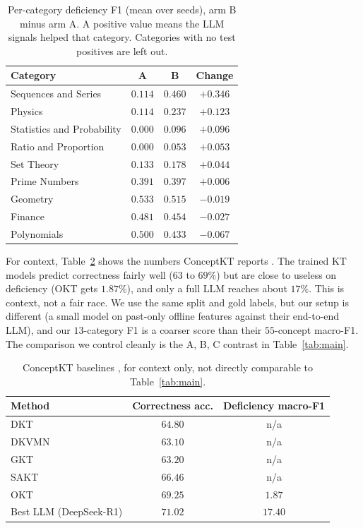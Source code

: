 \documentclass[11pt]{article}
\begin{document}
\begin{table}[t]
\centering
\caption{Per-category deficiency F1 (mean over seeds), arm B minus arm A. A positive
value means the LLM signals helped that category. Categories with no test positives are
left out.}
\label{tab:erroranalysis}
\small
\begin{tabular}{@{}lccc@{}}
\toprule
\textbf{Category} & \textbf{A} & \textbf{B} & \textbf{Change}\\
\midrule
Sequences and Series        & $0.114$ & $0.460$ & $+0.346$\\
Physics                     & $0.114$ & $0.237$ & $+0.123$\\
Statistics and Probability  & $0.000$ & $0.096$ & $+0.096$\\
Ratio and Proportion        & $0.000$ & $0.053$ & $+0.053$\\
Set Theory                  & $0.133$ & $0.178$ & $+0.044$\\
Prime Numbers               & $0.391$ & $0.397$ & $+0.006$\\
Geometry                    & $0.533$ & $0.515$ & $-0.019$\\
Finance                     & $0.481$ & $0.454$ & $-0.027$\\
Polynomials                 & $0.500$ & $0.433$ & $-0.067$\\
\bottomrule
\end{tabular}
\end{table}

For context, Table~\ref{tab:context} shows the numbers ConceptKT reports
\cite{kang2026conceptkt}. The trained KT models predict correctness fairly well
($63$ to $69\%$) but are close to useless on deficiency (OKT gets $1.87\%$), and only a
full LLM reaches about $17\%$. This is context, not a fair race. We use the same split
and gold labels, but our setup is different (a small model on past-only offline
features against their end-to-end LLM), and our $13$-category F1 is a coarser score than
their $55$-concept macro-F1. The comparison we control cleanly is the A, B, C contrast
in Table~\ref{tab:main}.

\begin{table}[t]
\centering
\caption{ConceptKT baselines \cite{kang2026conceptkt}, for context only, not directly
comparable to Table~\ref{tab:main}.}
\label{tab:context}
\small
\begin{tabular}{@{}lcc@{}}
\toprule
\textbf{Method} & \textbf{Correctness acc.} & \textbf{Deficiency macro-F1}\\
\midrule
DKT                       & $64.80$ & n/a\\
DKVMN                     & $63.10$ & n/a\\
GKT                       & $63.20$ & n/a\\
SAKT                      & $66.46$ & n/a\\
OKT                       & $69.25$ & $1.87$\\
Best LLM (DeepSeek-R1)    & $71.02$ & $17.40$\\
\bottomrule
\end{tabular}
\end{table}
\end{document}
